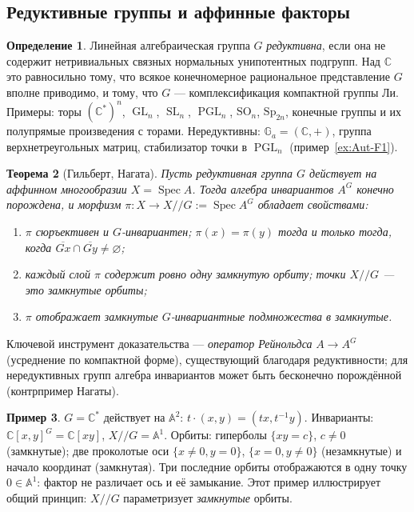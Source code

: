 \documentclass[11pt,a4paper]{article}
\theoremstyle{plain}
\newtheorem{theorem}{Теорема}[section]
\theoremstyle{definition}
\newtheorem{definition}[theorem]{Определение}
\newtheorem{example}[theorem]{Пример}
\theoremstyle{remark}
\renewcommand{\C}{\mathbb{C}}
\newcommand{\A}{\mathbb{A}}
\DeclareMathOperator{\GL}{GL}
\DeclareMathOperator{\SL}{SL}
\DeclareMathOperator{\PGL}{PGL}
\DeclareMathOperator{\Spec}{Spec}
\begin{document}
\subsection{Редуктивные группы и аффинные факторы}

\begin{definition}
Линейная алгебраическая группа $G$ \emph{редуктивна}, если она не содержит нетривиальных связных
нормальных унипотентных подгрупп. Над $\C$ это равносильно тому, что всякое конечномерное
рациональное представление $G$ вполне приводимо, и тому, что $G$ --- комплексификация компактной
группы Ли. Примеры: торы $(\C^*)^n$, $\GL_n$, $\SL_n$, $\PGL_n$, $\mathrm{SO}_n$, $\mathrm{Sp}_{2n}$,
конечные группы и их полупрямые произведения с торами. Нередуктивны: $\mathbb G_a=(\C,+)$,
группа верхнетреугольных матриц, стабилизатор точки в $\PGL_n$ (пример~\ref{ex:Aut-F1}).
\end{definition}

\begin{theorem}[Гильберт, Нагата]\label{thm:Hilbert-finiteness}
Пусть редуктивная группа $G$ действует на аффинном многообразии $X=\Spec A$. Тогда алгебра
инвариантов $A^G$ конечно порождена, и морфизм $\pi\colon X\to X/\!/G:=\Spec A^G$ обладает
свойствами:
\begin{enumerate}
\item $\pi$ сюръективен и $G$-инвариантен; $\pi(x)=\pi(y)$ тогда и только тогда, когда
$\overline{Gx}\cap\overline{Gy}\ne\varnothing$;
\item каждый слой $\pi$ содержит ровно одну замкнутую орбиту; точки $X/\!/G$ --- это замкнутые орбиты;
\item $\pi$ отображает замкнутые $G$-инвариантные подмножества в замкнутые.
\end{enumerate}
\end{theorem}

Ключевой инструмент доказательства --- \emph{оператор Рейнольдса} $A\to A^G$ (усреднение по
компактной форме), существующий благодаря редуктивности; для нередуктивных групп алгебра
инвариантов может быть бесконечно порождённой (контрпример Нагаты).

\begin{example}\label{ex:Cstar-C2}
$G=\C^*$ действует на $\A^2$: $t\cdot(x,y)=(tx,t^{-1}y)$. Инварианты: $\C[x,y]^G=\C[xy]$,
$X/\!/G=\A^1$. Орбиты: гиперболы $\{xy=c\}$, $c\ne0$ (замкнутые); две проколотые оси
$\{x\ne0,y=0\}$, $\{x=0,y\ne0\}$ (незамкнутые) и начало координат (замкнутая). Три последние
орбиты отображаются в одну точку $0\in\A^1$: фактор не различает ось и её замыкание.
Этот пример иллюстрирует общий принцип: $X/\!/G$ параметризует \emph{замкнутые} орбиты.
\end{example}
\end{document}
